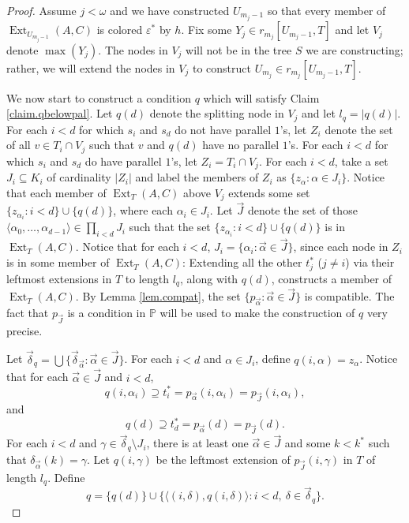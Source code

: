 \documentclass{amsart}
\theoremstyle{remark}
\theoremstyle{definition}
\theoremstyle{remark}
\newcommand{\al}{\alpha}
\newcommand{\om}{\omega}
\newcommand{\sse}{\subseteq}
\newcommand{\contains}{\supseteq}
\DeclareMathOperator{\Ext}{Ext}
\newcommand{\bP}{\mathbb{P}}
\newcommand{\lgl}{\langle}
\newcommand{\rgl}{\rangle}
\begin{document}
\begin{proof}
Assume  $j<\om$ and
 we have constructed $U_{m_j-1}$ so that every member of $\Ext_{U_{m_j-1}}(A,C)$ is colored $\varepsilon^*$ by $h$.
Fix some  $Y_j\in r_{m_j}[U_{m_j -1} ,T]$ and let $V_j$ denote $\max(Y_j)$.
The nodes in $V_j$ will not be in the tree $S$ we are constructing;
rather,
we will extend the nodes in $V_j$ to construct
$U_{m_j}\in r_{m_j}[U_{m_j-1},T]$.


We now start to construct a condition $q$ which will satisfy Claim \ref{claim.qbelowpal}.
Let $q(d)$ denote  the splitting node in $V_j$ and let $l_q=|q(d)|$.
For each $i<d$
for which $s_i$ and $s_d$ do not have parallel $1$'s,
 let
$Z_i$ denote the set of all
$v\in T_i\cap V_j$
such that $v$ and $q(d)$ have no parallel $1$'s.
For each $i<d$ for which $s_i$ and $s_d$ do have parallel $1$'s,
let $Z_i= T_i\cap V_j$.
For each $i<d$,
take  a set $J_i\sse K_i$ of cardinality $|Z_i|$
and label the members of $Z_i$ as
$\{z_{\al}:\al\in J_i\}$.
Notice that each member of $\Ext_T(A,C)$ above $V_j$ extends some set $\{z_{\al_i}:i<d\}\cup\{q(d)\}$, where each $\al_i\in J_i$.
Let $\vec{J}$ denote the set of those $\lgl \al_0,\dots,\al_{d-1}\rgl\in \prod_{i< d}J_i$ such that  the set $\{z_{\al_i}:i< d\}\cup\{q(d)\}$ is in $\Ext_T(A,C)$.
Notice that for each $i<d$,
$J_i=\{\al_i:\vec\al\in\vec{J}\}$, since
each node in $Z_i$ is
 in some member of $\Ext_T(A,C)$:
 Extending all the other $t_j^*$ ($j\ne i$) via their leftmost extensions in $T$ to length $l_q$, along with $q(d)$, constructs a member of $\Ext_T(A,C)$.
By Lemma \ref{lem.compat},
the set $\{p_{\vec\al}:\vec\al\in\vec{J}\}$ is compatible.
The fact that
$p_{\vec{J}}$ is a condition in $\bP$ will be used
to make  the construction of $q$ very precise.




Let
 $\vec{\delta}_q=\bigcup\{\vec{\delta}_{\vec\al}:\vec\al\in \vec{J}\}$.
For each $i<d$ and $\al\in J_i$,
define $q(i,\al)=z_{\al}$.
Notice that for each
$\vec\al\in \vec{J}$ and $i<d$,
\begin{equation}
q(i,\al_i)\contains t^*_i=p_{\vec\al}(i,\al_i)=p_{\vec{J}}(i,\al_i),
\end{equation}
and
\begin{equation}
q(d)\contains t^*_d=p_{\vec\al}(d)=p_{\vec{J}}(d).
\end{equation}
For each  $i<d$ and $\gamma\in\vec{\delta}_q\setminus
J_i$,
there is at least one $\vec{\al}\in\vec{J}$ and some $k<k^*$ such that $\delta_{\vec\al}(k)=\gamma$.
Let $q(i,\gamma)$ be the leftmost extension
 of $p_{\vec{J}}(i,\gamma)$ in $T$ of length $l_q$.
Define
\begin{equation}
q=\{q(d)\}\cup \{\lgl (i,\delta),q(i,\delta)\rgl: i<d,\  \delta\in \vec{\delta}_q\}.
\end{equation}





\end{proof}
\end{document}
